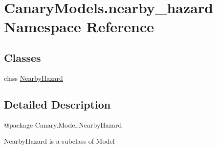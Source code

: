 \hypertarget{namespace_canary_models_1_1nearby__hazard}{\section{Canary\-Models.\-nearby\-\_\-hazard Namespace Reference}
\label{namespace_canary_models_1_1nearby__hazard}
}
\subsection*{Classes}
\begin{DoxyCompactItemize}
\item 
class \hyperlink{class_canary_models_1_1nearby__hazard_1_1_nearby_hazard}{Nearby\-Hazard}
\end{DoxyCompactItemize}


\subsection{Detailed Description}
\begin{DoxyVerb}@package Canary.Model.NearbyHazard

NearbyHazard is a subclass of Model
\end{DoxyVerb}
 